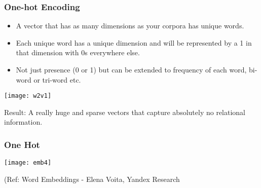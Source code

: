 



\begin{frame}[fragile]\frametitle{One-hot Encoding}
  \begin{itemize}
	\item A vector that has as many dimensions as your corpora has unique words. 
	\item Each unique word has a unique dimension and will be represented by a 1 in that dimension with 0s everywhere else.
	\item Not just presence (0 or 1) but can be extended to  frequency of each word, bi-word or tri-word etc.
  \end{itemize}
  
\begin{center}
\texttt{[image: w2v1]}
\end{center}

Result: A really huge and sparse vectors that capture absolutely no relational information.
\end{frame}


\begin{frame}[fragile]\frametitle{One Hot}
\begin{center}
\texttt{[image: emb4]}
\end{center}

{\tiny (Ref: Word Embeddings - Elena Voita, Yandex Research}
\end{frame}


